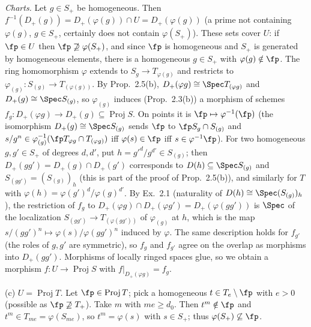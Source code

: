 \documentclass[11pt]{article}
\begin{document}
\emph{Charts.} Let $g\in S_+$ be homogeneous. Then $f^{-1}(D_+(g))=D_+(\varphi(g))\cap U=D_+(\varphi(g))$ (a prime not containing $\varphi(g)$, $g\in S_+$, certainly does not contain $\varphi(S_+)$). These sets cover $U$: if $\fp\in U$ then $\fp\not\supseteq\varphi(S_+)$, and since $\fp$ is homogeneous and $S_+$ is generated by homogeneous elements, there is a homogeneous $g\in S_+$ with $\varphi(g)\notin\fp$. The ring homomorphism $\varphi$ extends to $S_g\to T_{\varphi(g)}$ and restricts to $\varphi_{(g)}:S_{(g)}\to T_{(\varphi(g))}$. By Prop.~2.5(b), $D_+(\varphi g)\cong\Spec T_{(\varphi g)}$ and $D_+(g)\cong\Spec S_{(g)}$, so $\varphi_{(g)}$ induces (Prop.~2.3(b)) a morphism of schemes $f_g:D_+(\varphi g)\to D_+(g)\subseteq\operatorname{Proj}S$. On points it is $\fp\mapsto\varphi^{-1}(\fp)$ (the isomorphism $D_+(g)\cong\Spec S_{(g)}$ sends $\fp$ to $\fp S_g\cap S_{(g)}$ and $s/g^n\in\varphi_{(g)}^{-1}(\fp T_{\varphi g}\cap T_{(\varphi g)})$ iff $\varphi(s)\in\fp$ iff $s\in\varphi^{-1}\fp$). For two homogeneous $g,g'\in S_+$ of degrees $d,d'$, put $h=g'^d/g^{d'}\in S_{(g)}$; then $D_+(gg')=D_+(g)\cap D_+(g')$ corresponds to $D(h)\subseteq\Spec S_{(g)}$ and $S_{(gg')}=(S_{(g)})_h$ (this is part of the proof of Prop.~2.5(b)), and similarly for $T$ with $\varphi(h)=\varphi(g')^d/\varphi(g)^{d'}$. By Ex.~2.1 (naturality of $D(h)\cong\Spec(S_{(g)})_h$), the restriction of $f_g$ to $D_+(\varphi g)\cap D_+(\varphi g')=D_+(\varphi(gg'))$ is $\Spec$ of the localization $S_{(gg')}\to T_{(\varphi(gg'))}$ of $\varphi_{(g)}$ at $h$, which is the map $s/(gg')^n\mapsto\varphi(s)/\varphi(gg')^n$ induced by $\varphi$. The same description holds for $f_{g'}$ (the roles of $g,g'$ are symmetric), so $f_g$ and $f_{g'}$ agree on the overlap as morphisms into $D_+(gg')$. Morphisms of locally ringed spaces glue, so we obtain a morphism $f:U\to\operatorname{Proj}S$ with $f|_{D_+(\varphi g)}=f_g$.

(c) \emph{$U=\operatorname{Proj}T$.} Let $\fp\in\operatorname{Proj}T$; pick a homogeneous $t\in T_e\setminus\fp$ with $e>0$ (possible as $\fp\not\supseteq T_+$). Take $m$ with $me\ge d_0$. Then $t^m\notin\fp$ and $t^m\in T_{me}=\varphi(S_{me})$, so $t^m=\varphi(s)$ with $s\in S_+$; thus $\varphi(S_+)\not\subseteq\fp$.
\end{document}
